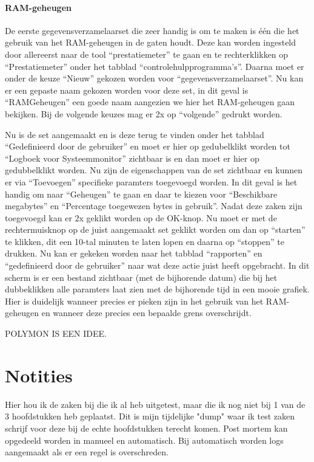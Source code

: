 \documentclass[pdftex,a4paper,12pt]{report}
\begin{document}
\subsubsection{RAM-geheugen}
De eerste gegevensverzamelaarset die zeer handig is om te maken is één die het gebruik van het RAM-geheugen in de gaten houdt. Deze kan worden ingesteld door allereerst naar de tool "`prestatiemeter"' te gaan en te rechterklikken op "`Prestatiemeter"' onder het tabblad "`controlehulpprogramma's"'. Daarna moet er onder de keuze "`Nieuw"' gekozen worden voor "`gegevensverzamelaarset"'. Nu kan er een gepaste naam gekozen worden voor deze set, in dit geval is "`RAMGeheugen"' een goede naam aangezien we hier het RAM-geheugen gaan bekijken. Bij de volgende keuzes mag er 2x op "`volgende"' gedrukt worden. \newline

Nu is de set aangemaakt en is deze terug te vinden onder het tabblad "`Gedefinieerd door de gebruiker"' en moet er hier op gedubelklikt worden tot "`Logboek voor Systeemmonitor"' zichtbaar is en dan moet er hier op gedubbelklikt worden. Nu zijn de eigenschappen van de set zichtbaar en kunnen er via "`Toevoegen"' specifieke paramters toegevoegd worden. In dit geval is het handig om naar "`Geheugen"' te gaan en daar te kiezen voor "`Beschikbare megabytes"' en "`Percentage toegewezen bytes in gebruik"'.	Nadat deze zaken zijn toegevoegd kan er 2x geklikt worden op de OK-knop. Nu moet er met de rechtermuisknop op de juist aangemaakt set geklikt worden om dan op "`starten"' te klikken, dit een 10-tal minuten te laten lopen en daarna op "`stoppen"' te drukken. Nu kan er gekeken worden naar het tabblad "`rapporten"' en "`gedefinieerd door de gebruiker"' naar wat deze actie juist heeft opgebracht. In dit scherm is er een bestand zichtbaar (met de bijhorende datum) die bij het dubbeklikken alle paramters laat zien met de bijhorende tijd in een mooie grafiek. Hier is duidelijk wanneer precies er pieken zijn in het gebruik van het RAM-geheugen en wanneer deze precies een bepaalde grens overschrijdt.

POLYMON IS EEN IDEE.


\chapter{Notities}
Hier hou ik de zaken bij die ik al heb uitgetest, maar die ik nog niet bij 1 van de 3 hoofdstukken heb geplaatst. Dit is mijn tijdelijke "dump" waar ik test zaken schrijf voor deze bij de echte hoofdstukken terecht komen.
\newpage
Post mortem kan opgedeeld worden in manueel en automatisch. Bij automatisch worden logs aangemaakt als er een regel is overschreden.
\end{document}
